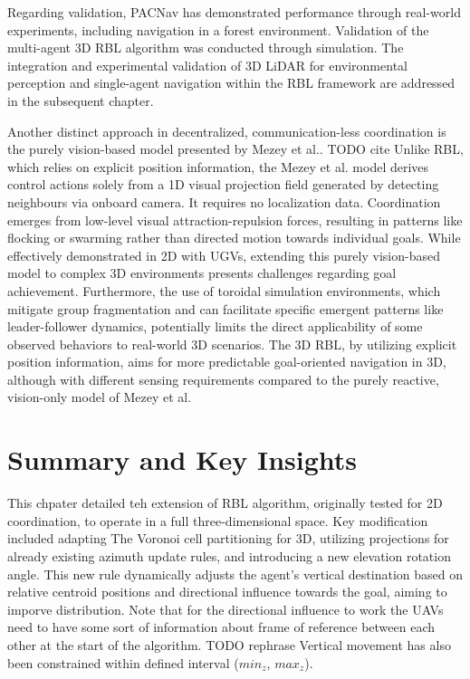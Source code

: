         Regarding validation, PACNav has demonstrated performance through real-world experiments, including navigation in a forest environment. 
        Validation of the multi-agent 3D RBL algorithm was conducted through simulation.
        The integration and experimental validation of 3D LiDAR for environmental perception and single-agent navigation within the RBL framework are addressed in the subsequent chapter.

        Another distinct approach in decentralized, communication-less coordination is the purely vision-based model presented by Mezey et al.. TODO cite
        Unlike RBL, which relies on explicit position information, the Mezey et al. model derives control actions solely from a 1D visual projection field generated by detecting neighbours via onboard camera. 
        It requires no localization data. Coordination emerges from low-level visual attraction-repulsion forces, resulting in patterns like flocking or swarming rather than directed motion towards individual goals. 
        While effectively demonstrated in 2D with \ac{UGV}s, extending this purely vision-based model to complex 3D environments presents challenges regarding goal achievement. 
        Furthermore, the use of toroidal simulation environments, which mitigate group fragmentation and can facilitate specific emergent patterns like leader-follower dynamics, potentially limits the direct applicability of some observed behaviors to real-world 3D scenarios.
        The 3D RBL, by utilizing explicit position information, aims for more predictable goal-oriented navigation in 3D, although with different sensing requirements compared to the purely reactive, vision-only model of Mezey et al. 
                
    \section{Summary and Key Insights}
        This chpater detailed teh extension of \ac{RBL} algorithm, originally tested for 2D coordination, to operate in a full three-dimensional space.
        Key modification included adapting The Voronoi cell partitioning for 3D, utilizing projections for already existing azimuth update rules, and introducing a new elevation rotation angle.
        This new rule dynamically adjusts the agent's vertical destination based on relative centroid positions and directional influence towards the goal, aiming to imporve distribution.
        Note that for the directional influence to work the UAVs need to have some sort of information about frame of reference between each other at the start of the algorithm. TODO rephrase
        Vertical movement has also been constrained within defined interval ($min_z$, $max_z$).

